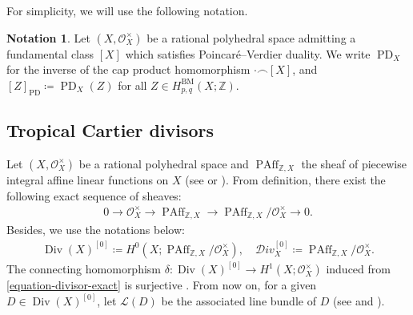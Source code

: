 \documentclass[a4paper,dvipdfmx,reqno,12pt]{amsart}
\theoremstyle{definition}
\newtheorem{notation}[theorem]{Notation}
\newcommand{\deq}{\coloneqq}
\newcommand{\opn}[1]{\operatorname{#1}}
\newcommand{\PD}[1]{[#1]_{\mathrm{PD}}}
\numberwithin{equation}{section}
\begin{document}
For simplicity, we will use the following notation.
\begin{notation}
Let $(X,\mathcal{O}_X^{\times})$ be
a rational polyhedral space admitting
a fundamental class $[X]$ which satisfies
Poincar\'e--Verdier duality.
We write $\opn{PD}_X$ for the inverse of
the cap product homomorphism $\cdot \frown [X]$,
and $\PD{Z}\deq \opn{PD}_X(Z)$ for all 
$Z\in H^{\mathrm{BM}}_{p,q}(X;\mathbb{Z})$.
\end{notation}




\subsection{Tropical Cartier divisors}
Let 
$(X,\mathcal{O}_X^{\times})$ be a rational polyhedral space
and $\opn{PAff}_{\mathbb{Z},X}$ the sheaf
of piecewise integral affine linear functions
on $X$
(see \cite[Definition 4.1]{MR3894860}
or \cite[Definition 3.8 and Remark
3.9]{MR4637248}).
From definition, there exist the following
exact sequence of sheaves:
\begin{align}
\label{equation-divisor-exact}
0 \to  \mathcal{O}_X^{\times} 
\to \opn{PAff}_{\mathbb{Z},X} \to 
\opn{PAff}_{\mathbb{Z},X}/\mathcal{O}_X^{\times}
\to 0.
\end{align}
Besides, we use the notations below:
\begin{align}
\opn{Div}(X)^{[0]}\deq H^{0}(X;
\opn{PAff}_{\mathbb{Z},X}/\mathcal{O}_X^{\times}), 
\quad \mathcal{D}iv_X^{[0]}\deq
\opn{PAff}_{\mathbb{Z},X}/\mathcal{O}_X^{\times}.
\end{align}
The connecting homomorphism 
$\delta \colon \opn{Div}(X)^{[0]}\to 
H^{1}(X;\mathcal{O}_X^{\times})$
induced from \eqref{equation-divisor-exact}
is surjective \cite[Proposition 4.6]{MR3894860}.
From now on, for a given $D\in \opn{Div}(X)^{[0]}$,
let $\mathcal{L}(D)$ be the associated
line bundle of $D$
(see \cite[]{MR4637248} and 
\cite[]{MR2457739}).
\end{document}
